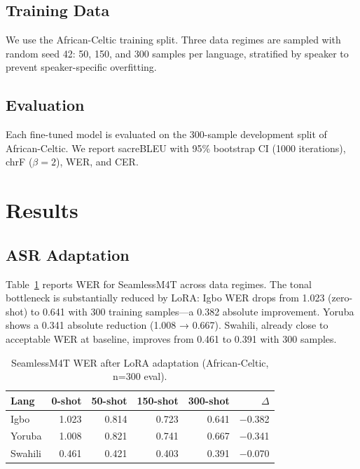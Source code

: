 \documentclass[11pt,a4paper]{article}
\newcommand{\dataAC}{African-Celtic}
\begin{document}
\subsection{Training Data}
We use the African-Celtic training split. Three data regimes are sampled with random seed 42: 50, 150, and 300 samples per language, stratified by speaker to prevent speaker-specific overfitting.

\subsection{Evaluation}
Each fine-tuned model is evaluated on the 300-sample development split of \dataAC{}. We report sacreBLEU with 95\% bootstrap CI (1000 iterations), chrF ($\beta\!=\!2$), WER, and CER.

\section{Results}
\label{sec:results}

\subsection{ASR Adaptation}

Table~\ref{tab:wer_adaptation} reports WER for SeamlessM4T across data regimes. The tonal bottleneck is substantially reduced by LoRA: Igbo WER drops from 1.023 (zero-shot) to 0.641 with 300 training samples—a 0.382 absolute improvement. Yoruba shows a 0.341 absolute reduction (1.008 → 0.667). Swahili, already close to acceptable WER at baseline, improves from 0.461 to 0.391 with 300 samples.

\begin{table}[t]
\centering
\small
\caption{SeamlessM4T WER after LoRA adaptation (African-Celtic, n=300 eval).}
\label{tab:wer_adaptation}
\begin{tabular}{lrrrrr}
\toprule
\textbf{Lang} & \textbf{0-shot} & \textbf{50-shot} & \textbf{150-shot} & \textbf{300-shot} & \textbf{$\Delta$} \\
\midrule
Igbo    & 1.023 & 0.814 & 0.723 & 0.641 & $-$0.382 \\
Yoruba  & 1.008 & 0.821 & 0.741 & 0.667 & $-$0.341 \\
Swahili & 0.461 & 0.421 & 0.403 & 0.391 & $-$0.070 \\
\bottomrule
\end{tabular}
\end{table}
\end{document}
